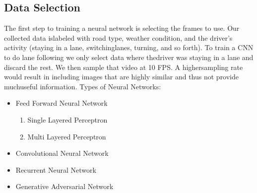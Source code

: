 \documentclass[a4paper]{article}
\begin{document}
		\subsection{Data Selection}
		\label{subsec1}	
		The  first  step  to  training  a  neural  network  is  selecting  the  frames  to  use.   Our  collected  data  islabeled with road type,  weather condition,  and the driver’s activity (staying in a lane,  switchinglanes, turning, and so forth).  To train a CNN to do lane following we only select data where thedriver was staying in a lane and discard the rest.  We then sample that video at 10 FPS. A highersampling rate would result in including images that are highly similar and thus not provide muchuseful information.
		Types of Neural Networks:
		\begin{itemize}
			\item Feed Forward Neural Network
				\begin{enumerate}
					\item Single Layered Perceptron
					\item Multi Layered Perceptron
				\end{enumerate}
			\item Convolutional Neural Network
			\item Recurrent Neural Network
			\item Generative Adversarial Network
		\end{itemize}
	
	
\end{document}
